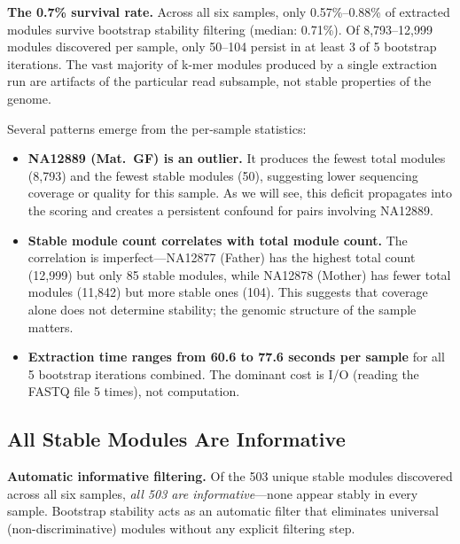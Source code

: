 \documentclass{../yalumba}
\begin{document}
\begin{keyfinding}
\textbf{The 0.7\% survival rate.}  Across all six samples, only 0.57\%--0.88\%
of extracted modules survive bootstrap stability filtering (median: 0.71\%).
Of 8{,}793--12{,}999 modules discovered per sample, only 50--104 persist in at
least 3 of 5 bootstrap iterations.  The vast majority of k-mer modules produced
by a single extraction run are artifacts of the particular read subsample, not
stable properties of the genome.
\end{keyfinding}

Several patterns emerge from the per-sample statistics:

\begin{itemize}
  \item \textbf{NA12889 (Mat.\ GF) is an outlier.}  It produces the fewest
    total modules (8{,}793) and the fewest stable modules (50), suggesting
    lower sequencing coverage or quality for this sample.  As we will see,
    this deficit propagates into the scoring and creates a persistent
    confound for pairs involving NA12889.
  \item \textbf{Stable module count correlates with total module count.}
    The correlation is imperfect---NA12877 (Father) has the highest total count
    (12{,}999) but only 85 stable modules, while NA12878 (Mother) has fewer
    total modules (11{,}842) but more stable ones (104).  This suggests that
    coverage alone does not determine stability; the genomic structure of the
    sample matters.
  \item \textbf{Extraction time ranges from 60.6 to 77.6 seconds per sample}
    for all 5 bootstrap iterations combined.  The dominant cost is I/O
    (reading the FASTQ file 5 times), not computation.
\end{itemize}

\subsection{All Stable Modules Are Informative}

\begin{keyfinding}
\textbf{Automatic informative filtering.}  Of the 503 unique stable modules
discovered across all six samples, \emph{all 503 are informative}---none
appear stably in every sample.  Bootstrap stability acts as an automatic
filter that eliminates universal (non-discriminative) modules without any
explicit filtering step.
\end{keyfinding}
\end{document}
